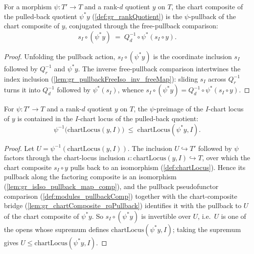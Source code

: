 \begin{lemma}
  \label{lem:gr_chartComposite_rqPullback}
  For a morphism \(\psi : T' \to T\) and a rank-\(d\) quotient \(y\) on \(T\), the chart
  composite of the pulled-back quotient \(\psi^{*}y\) (\cref{def:gr_rankQuotient}) is the
  \(\psi\)-pullback of the chart composite of \(y\), conjugated through the free-pullback
  comparison:
  \[
    s_I \circ (\psi^{*}y)
      \;=\; Q_d^{-1} \circ \psi^{*}(s_I \circ y).
  \]
\end{lemma}
\begin{proof}
  Unfolding the pullback action, \(s_I \circ (\psi^{*}y)\) is the coordinate inclusion
  \(s_I\) followed by \(Q_r^{-1}\) and \(\psi^{*}y\). The inverse free-pullback comparison
  intertwines the index inclusion (\cref{lem:gr_pullbackFreeIso_inv_freeMap}): sliding
  \(s_I\) across \(Q_r^{-1}\) turns it into \(Q_d^{-1}\) followed by \(\psi^{*}(s_I)\),
  whence \(s_I \circ (\psi^{*}y) = Q_d^{-1} \circ \psi^{*}(s_I \circ y)\).
\end{proof}

\begin{lemma}
  \label{lem:gr_chartLocus_rqPullback}
  For \(\psi : T' \to T\) and a rank-\(d\) quotient \(y\) on \(T\), the \(\psi\)-preimage of
  the \(I\)-chart locus of \(y\) is contained in the \(I\)-chart locus of the pulled-back
  quotient:
  \[
    \psi^{-1}\bigl(\mathrm{chartLocus}(y, I)\bigr)
      \;\le\; \mathrm{chartLocus}(\psi^{*}y, I).
  \]
\end{lemma}
\begin{proof}
  Let \(U = \psi^{-1}(\mathrm{chartLocus}(y, I))\). The inclusion \(U \hookrightarrow T'\)
  followed by \(\psi\) factors through the chart-locus inclusion
  \(\iota : \mathrm{chartLocus}(y, I) \hookrightarrow T\), over which the chart composite
  \(s_I \circ y\) pulls back to an isomorphism (\cref{def:chartLocus}). Hence its pullback
  along the factoring composite is an isomorphism
  (\cref{lem:gr_isIso_pullback_map_comp}), and the pullback pseudofunctor comparison
  (\cref{def:modules_pullbackComp}) together with the chart-composite bridge
  (\cref{lem:gr_chartComposite_rqPullback}) identifies it with the pullback to \(U\) of the
  chart composite of \(\psi^{*}y\). So \(s_I \circ (\psi^{*}y)\) is invertible over \(U\),
  i.e.\ \(U\) is one of the opens whose supremum defines
  \(\mathrm{chartLocus}(\psi^{*}y, I)\); taking the supremum gives
  \(U \le \mathrm{chartLocus}(\psi^{*}y, I)\).
\end{proof}

